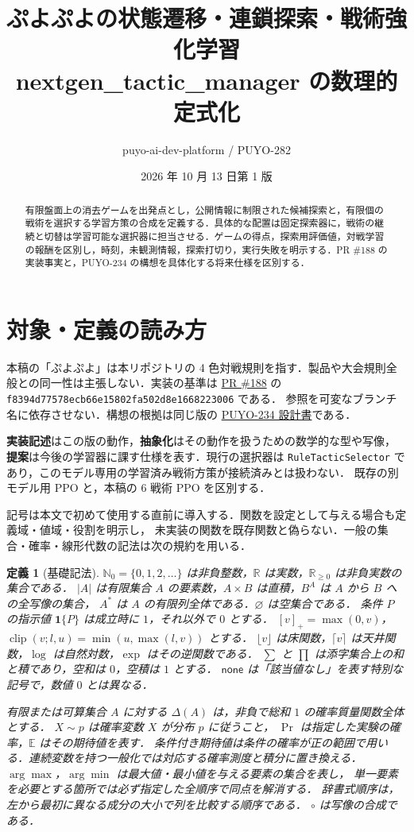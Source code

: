 \documentclass[a4paper,11pt]{article}
\title{ぷよぷよの状態遷移・連鎖探索・戦術強化学習\\\large nextgen\_tactic\_manager の数理的定式化}
\author{puyo-ai-dev-platform / PUYO-282}
\date{2026 年 10 月 13 日\quad 第 1 版}
\numberwithin{equation}{section}
\newtheorem{definition}{定義}[section]
\newcommand{\N}{\mathbb{N}_0}
\newcommand{\R}{\mathbb{R}}
\newcommand{\ind}{\mathbf{1}}
\newcommand{\none}{\mathsf{none}}
\newcommand{\code}[1]{\nolinkurl{#1}}
\newcommand{\srcja}[2]{\href{https://github.com/shhchan/puyo-ai-dev-platform/blob/f8394d77578ecb66e15802fa502d8e1668223006/#1}{#2}}
\begin{document}
\maketitle
\begin{abstract}
有限盤面上の消去ゲームを出発点とし，公開情報に制限された候補探索と，有限個の戦術を選択する学習方策の合成を定義する．具体的な配置は固定探索器に，戦術の継続と切替は学習可能な選択器に担当させる．ゲームの得点，探索用評価値，対戦学習の報酬を区別し，時刻，未観測情報，探索打切り，実行失敗を明示する．PR \#188 の実装事実と，PUYO-234 の構想を具体化する将来仕様を区別する．
\end{abstract}
\setcounter{tocdepth}{1}
\tableofcontents
\clearpage
\section{対象・定義の読み方}\label{sec:scope}
本稿の「ぷよぷよ」は本リポジトリの 4 色対戦規則を指す．製品や大会規則全般との同一性は主張しない．実装の基準は
\href{https://github.com/shhchan/puyo-ai-dev-platform/pull/188}{PR \#188} の
\code{f8394d77578ecb66e15802fa502d8e1668223006} である．
参照を可変なブランチ名に依存させない．構想の根拠は同じ版の
\srcja{docs/development/puyo-234-next-generation-model-design.md}{PUYO-234 設計書}である．

\textbf{実装記述}はこの版の動作，\textbf{抽象化}はその動作を扱うための数学的な型や写像，
\textbf{提案}は今後の学習器に課す仕様を表す．現行の選択器は
\code{RuleTacticSelector} であり，このモデル専用の学習済み戦術方策が接続済みとは扱わない．
既存の別モデル用 PPO と，本稿の 6 戦術 PPO を区別する．

記号は本文で初めて使用する直前に導入する．関数を設定として与える場合も定義域・値域・役割を明示し，
未実装の関数を既存関数と偽らない．一般の集合・確率・線形代数の記法は次の規約を用いる．
\begin{definition}[基礎記法]\label{def:notation}
$\N=\{0,1,2,\ldots\}$ は非負整数，$\R$ は実数，$\R_{\geq0}$ は非負実数の集合である．
$|A|$ は有限集合 $A$ の要素数，$A\times B$ は直積，$B^A$ は $A$ から $B$ への全写像の集合，
$A^*$ は $A$ の有限列全体である．$\varnothing$ は空集合である．
条件 $P$ の指示値 $\ind\{P\}$ は成立時に $1$，それ以外で $0$ とする．
$[v]_+=\max(0,v)$，$\operatorname{clip}(v;l,u)=\min(u,\max(l,v))$ とする．
$\lfloor v\rfloor$ は床関数，$\lceil v\rceil$ は天井関数，$\log$ は自然対数，$\exp$ はその逆関数である．
$\sum$ と $\prod$ は添字集合上の和と積であり，空和は $0$，空積は $1$ とする．
$\none$ は「該当値なし」を表す特別な記号で，数値 $0$ とは異なる．

有限または可算集合 $A$ に対する $\Delta(A)$ は，非負で総和 $1$ の確率質量関数全体とする．
$X\sim p$ は確率変数 $X$ が分布 $p$ に従うこと，
$\Pr$ は指定した実験の確率，$\mathbb E$ はその期待値を表す．
条件付き期待値は条件の確率が正の範囲で用いる．連続変数を持つ一般化では対応する確率測度と積分に置き換える．
$\arg\max$，$\arg\min$ は最大値・最小値を与える要素の集合を表し，
単一要素を必要とする箇所では必ず指定した全順序で同点を解消する．
辞書式順序は，左から最初に異なる成分の大小で列を比較する順序である．
$\circ$ は写像の合成である．
\end{definition}





\end{document}
